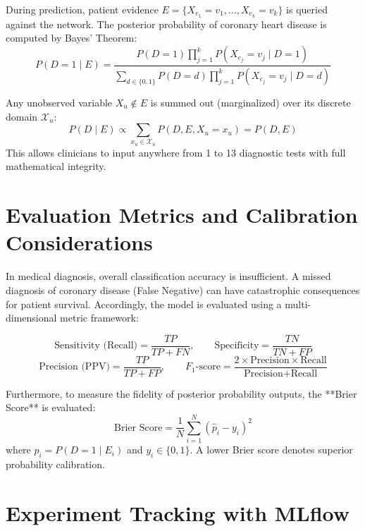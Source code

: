 \documentclass[12pt,a4paper]{report}
\begin{document}
During prediction, patient evidence $E = \{ X_{e_1} = v_1, \dots, X_{e_k} = v_k \}$ is queried against the network. The posterior probability of coronary heart disease is computed by Bayes' Theorem:
\begin{equation}
P(D = 1 \mid E) = \frac{P(D = 1) \prod_{j=1}^k P(X_{e_j} = v_j \mid D = 1)}{\sum_{d \in \{0, 1\}} P(D = d) \prod_{j=1}^k P(X_{e_j} = v_j \mid D = d)}
\end{equation}

Any unobserved variable $X_u \notin E$ is summed out (marginalized) over its discrete domain $\mathcal{X}_u$:
\begin{equation}
P(D \mid E) \propto \sum_{x_u \in \mathcal{X}_u} P(D, E, X_u = x_u) = P(D, E)
\end{equation}
This allows clinicians to input anywhere from 1 to 13 diagnostic tests with full mathematical integrity.

\section{Evaluation Metrics and Calibration Considerations}

In medical diagnosis, overall classification accuracy is insufficient. A missed diagnosis of coronary disease (False Negative) can have catastrophic consequences for patient survival. Accordingly, the model is evaluated using a multi-dimensional metric framework:

\begin{equation}
\text{Sensitivity (Recall)} = \frac{TP}{TP + FN}, \qquad \text{Specificity} = \frac{TN}{TN + FP}
\end{equation}
\begin{equation}
\text{Precision (PPV)} = \frac{TP}{TP + FP}, \qquad F_1\text{-score} = \frac{2 \times \text{Precision} \times \text{Recall}}{\text{Precision} + \text{Recall}}
\end{equation}

Furthermore, to measure the fidelity of posterior probability outputs, the **Brier Score** is evaluated:
\begin{equation}
\text{Brier Score} = \frac{1}{N} \sum_{i=1}^N \left( \hat{p}_i - y_i \right)^2
\end{equation}
where $\hat{p}_i = P(D = 1 \mid E_i)$ and $y_i \in \{0, 1\}$. A lower Brier score denotes superior probability calibration.

\section{Experiment Tracking with MLflow}
\end{document}

